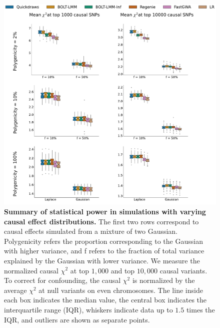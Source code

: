 \begin{figure}[h!]
    \centering
    \includegraphics[width=\textwidth]{figures/sim_power/mog_power.pdf}
    \caption{
    \textbf{Summary of statistical power in simulations with varying causal effect distributions.}
    The first two rows correspond to causal effects simulated from a mixture of two Gaussian. 
    Polygenicity refers the proportion corresponding to the Gaussian with higher variance, and f refers to the fraction of total variance explained by the Gaussian with lower variance.
    We measure the normalized causal $\chi^2$ at top $1{,}000$ and top $10{,}000$ causal variants.
    To correct for confounding, the causal $\chi^2$ is normalized by the average $\chi^2$ at null variants on even chromosomes.
    The line inside each box indicates the median value, the central box indicates the interquartile range (IQR), whiskers indicate data up to $1.5$ times the IQR, and outliers are shown as separate points.
    }
    \label{fig:sim_power_mog}
\end{figure}

